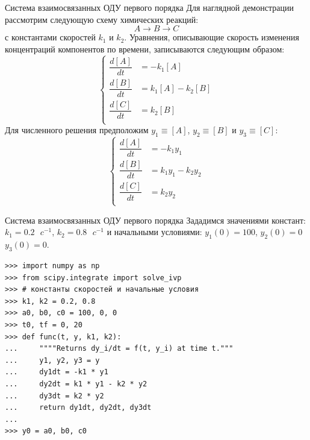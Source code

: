 \documentclass[aspectratio=169, mathserif]{beamer}	%
\begin{document}
\begin{frame}[fragile, label=c]{Система взаимосвязанных ОДУ первого порядка}
\scriptsize
Для наглядной демонстрации рассмотрим следующую схему химических реакций:
\vfill
$$
	A \rightarrow B \rightarrow C
$$
\vfill
\noindent с константами скоростей $k_1$ и $k_2$. Уравнения, описывающие скорость изменения концентраций компонентов по времени, записываются следующим образом:
\vfill
\begin{equation*}
	\left\{
	\begin{aligned}
		\dfrac{d\left[A\right]}{dt} &= -k_1\left[A\right] \\
		\dfrac{d\left[B\right]}{dt} &=  k_1\left[A\right] - k_2\left[B\right] \\
		\dfrac{d\left[C\right]}{dt} &=  k_2\left[B\right] \\
	\end{aligned}
	\right.
\end{equation*}
\vfill
Для численного решения предположим $y_1 \equiv \left[A\right]$,  $y_2 \equiv \left[B\right]$ и $y_3 \equiv \left[C\right]$:
\vfill
\begin{equation*}
	\left\{
	\begin{aligned}
		\dfrac{d\left[A\right]}{dt} &= -k_1y_1 \\
		\dfrac{d\left[B\right]}{dt} &=  k_1y_1 - k_2y_2 \\
		\dfrac{d\left[C\right]}{dt} &=  k_2y_2 \\
	\end{aligned}
	\right.
\end{equation*}
\vfill
\end{frame}

\begin{frame}[fragile, label=c]{Система взаимосвязанных ОДУ первого порядка}
\scriptsize
Зададимся значениями констант: $k_1 = 0.2 \text{ } c^{-1}$, $k_2 = 0.8 \text{ } c^{-1}$ и начальными условиями: $y_1(0) = 100$, $y_2(0) = 0$ $y_3(0) = 0$.
\vfill
\begin{verbatim}
>>> import numpy as np
>>> from scipy.integrate import solve_ivp
>>> # константы скоростей и начальные условия
>>> k1, k2 = 0.2, 0.8
>>> a0, b0, c0 = 100, 0, 0
>>> t0, tf = 0, 20
>>> def func(t, y, k1, k2):
...     """"Returns dy_i/dt = f(t, y_i) at time t."""
...     y1, y2, y3 = y
...     dy1dt = -k1 * y1
...     dy2dt = k1 * y1 - k2 * y2
...     dy3dt = k2 * y2
...     return dy1dt, dy2dt, dy3dt
...
>>> y0 = a0, b0, c0
\end{verbatim}
\vfill
\end{frame}
\end{document}
